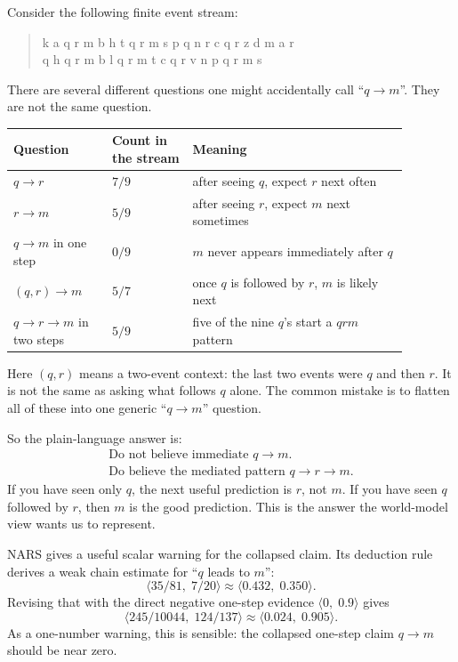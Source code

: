 \documentclass[11pt,openany]{report}
\begin{document}
\begin{example}
\label{ex:qrm-temporal-chaining}
Consider the following finite event stream:
\begin{quote}
\small\ttfamily
k a q r m b h t q r m s p q n r c q r z d m a r\\
q h q r m b l q r m t c q r v n p q r m s
\end{quote}
There are several different questions one might accidentally call
``$q \to m$''.  They are not the same question.

\medskip
\begin{center}
\small
\begin{tabular}{p{0.22\linewidth}p{0.18\linewidth}p{0.48\linewidth}}
\toprule
\textbf{Question} & \textbf{Count in the stream} & \textbf{Meaning} \\
\midrule
$q \to r$ & $7/9$ & after seeing $q$, expect $r$ next often \\
$r \to m$ & $5/9$ & after seeing $r$, expect $m$ next sometimes \\
$q \to m$ in one step & $0/9$ & $m$ never appears immediately after $q$ \\
$(q,r) \to m$ & $5/7$ & once $q$ is followed by $r$, $m$ is likely next \\
$q \to r \to m$ in two steps & $5/9$ & five of the nine $q$'s start a $qrm$ pattern \\
\bottomrule
\end{tabular}
\end{center}

\noindent
Here $(q,r)$ means a two-event context: the last two events were
$q$ and then $r$.  It is not the same as asking what follows $q$
alone.  The common mistake is to flatten all of these into one
generic ``$q \to m$'' question.

\noindent
So the plain-language answer is:
\[
\boxed{\begin{gathered}
\text{Do not believe immediate } q \to m.\\
\text{Do believe the mediated pattern } q \to r \to m.
\end{gathered}}
\]
If you have seen only $q$, the next useful prediction is $r$, not
$m$.  If you have seen $q$ followed by $r$, then $m$ is the good
prediction.  This is the answer the world-model view wants us to
represent.

NARS gives a useful scalar warning for the collapsed claim.  Its
deduction rule derives a weak chain estimate for ``$q$ leads to
$m$'':
\[
  \langle 35/81,\;7/20\rangle
  \approx \langle 0.432,\;0.350\rangle.
\]
Revising that with the direct negative one-step evidence
$\langle 0,\;0.9\rangle$ gives
\[
  \langle 245/10044,\;124/137\rangle
  \approx \langle 0.024,\;0.905\rangle.
\]
As a one-number warning, this is sensible: the collapsed one-step
claim $q \to m$ should be near zero.


\end{example}
\end{document}
